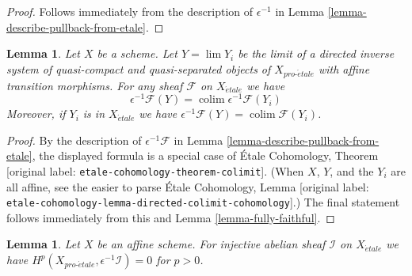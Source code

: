 \documentclass[10pt,a4paper]{article}
\theoremstyle{plain}
\newtheorem{lemma}[subsection]{Lemma}
\theoremstyle{definition}
\theoremstyle{remark}
\numberwithin{equation}{subsection}
\def\lim{\mathop{\mathrm{lim}}\nolimits}
\def\colim{\mathop{\mathrm{colim}}\nolimits}
\def\proetale{{pro\text{-}\acute{e}tale}}
\def\etale{{\acute{e}tale}}
\begin{document}
\begin{proof}
Follows immediately from the description of
$\epsilon^{-1}$ in Lemma \ref{lemma-describe-pullback-from-etale}.
\end{proof}

\begin{lemma}
\label{lemma-limit-pullback}
Let $X$ be a scheme. Let $Y = \lim Y_i$ be the limit of a directed inverse
system of quasi-compact and quasi-separated objects of $X_\proetale$
with affine transition morphisms. For any sheaf $\mathcal{F}$ on $X_\etale$
we have
$$
\epsilon^{-1}\mathcal{F}(Y) = \colim \epsilon^{-1}\mathcal{F}(Y_i)
$$
Moreover, if $Y_i$ is in $X_\etale$ we have
$\epsilon^{-1}\mathcal{F}(Y) = \colim \mathcal{F}(Y_i)$.
\end{lemma}

\begin{proof}
By the description of $\epsilon^{-1}\mathcal{F}$ in
Lemma \ref{lemma-describe-pullback-from-etale}, the displayed formula
is a special case of \'Etale Cohomology, Theorem
[original label: \nolinkurl{etale-cohomology-theorem-colimit}].
(When $X$, $Y$, and the $Y_i$ are all affine, see
the easier to parse \'Etale Cohomology, Lemma
[original label: \nolinkurl{etale-cohomology-lemma-directed-colimit-cohomology}].)
The final statement follows immediately from this
and Lemma \ref{lemma-fully-faithful}.
\end{proof}

\begin{lemma}
\label{lemma-affine-vanishing}
Let $X$ be an affine scheme. For injective abelian sheaf $\mathcal{I}$ on
$X_\etale$ we have $H^p(X_\proetale, \epsilon^{-1}\mathcal{I}) = 0$
for $p > 0$.
\end{lemma}
\end{document}
